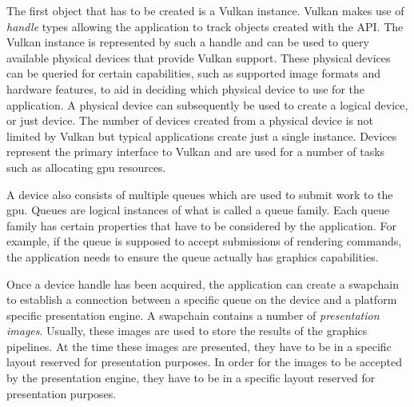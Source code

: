     The first object that has to be created is a Vulkan instance.
    Vulkan makes use of \textit{handle} types allowing the \gls{application} to track objects created with the API.
    The Vulkan instance is represented by such a handle and can be used to query available physical \glspl{device} that provide Vulkan support.
    These physical \glspl{device} can be queried for certain capabilities, such as supported image formats and hardware features, to aid in deciding which physical device to use for the \gls{application}.
    A physical device can subsequently be used to create a logical device, or just device.
    The number of \glspl{device} created from a physical device is not limited by Vulkan but typical applications create just a single instance.
    Devices represent the primary interface to Vulkan and are used for a number of tasks such as allocating \gls{gpu} resources.

    A device also consists of multiple queues which are used to submit work to the \gls{gpu}.
    Queues are logical instances of what is called a queue family.
    Each queue family has certain properties that have to be considered by the application.
    For example, if the queue is supposed to accept submissions of rendering commands, the application needs to ensure the queue actually has graphics capabilities.


    Once a device handle has been acquired, the \gls{application} can create a swapchain to establish a connection between a specific queue on the device and a platform specific presentation engine.
    A swapchain contains a number of \textit{presentation images}.
    Usually, these images are used to store the results of the graphics pipelines.
    At the time these images are presented, they have to be in a specific layout reserved for presentation purposes.
    In order for the images to be accepted by the presentation engine, they have to be in a specific layout reserved for presentation purposes.

